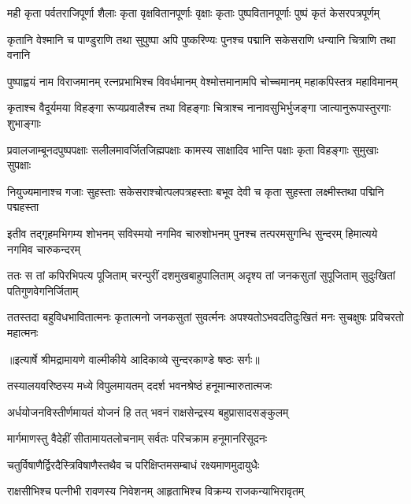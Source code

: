 \fourlineindentedshloka
{मही कृता पर्वतराजिपूर्णा}
{शैलाः कृता वृक्षवितानपूर्णाः}
{वृक्षाः कृताः पुष्पवितानपूर्णाः}
{पुष्पं कृतं केसरपत्रपूर्णम्} %

\fourlineindentedshloka
{कृतानि वेश्मानि च पाण्डुराणि}
{तथा सुपुष्पा अपि पुष्करिण्यः}
{पुनश्च पद्मानि सकेसराणि}
{धन्यानि चित्राणि तथा वनानि} %

\fourlineindentedshloka
{पुष्पाह्वयं नाम विराजमानम्}
{रत्नप्रभाभिश्च विवर्धमानम्}
{वेश्मोत्तमानामपि चोच्चमानम्}
{महाकपिस्तत्र महाविमानम्} %

\fourlineindentedshloka
{कृताश्च वैदूर्यमया विहङ्गा}
{रूप्यप्रवालैश्च तथा विहङ्गाः}
{चित्राश्च नानावसुभिर्भुजङ्गा}
{जात्यानुरूपास्तुरगाः शुभाङ्गाः} %

\fourlineindentedshloka
{प्रवालजाम्बूनदपुष्पपक्षाः}
{सलीलमावर्जितजिह्मपक्षाः}
{कामस्य साक्षादिव भान्ति पक्षाः}
{कृता विहङ्गाः सुमुखाः सुपक्षाः} %

\fourlineindentedshloka
{नियुज्यमानाश्च गजाः सुहस्ताः}
{सकेसराश्चोत्पलपत्रहस्ताः}
{बभूव देवी च कृता सुहस्ता}
{लक्ष्मीस्तथा पद्मिनि पद्महस्ता} %

\fourlineindentedshloka
{इतीव तद्गृहमभिगम्य शोभनम्}
{सविस्मयो नगमिव चारुशोभनम्}
{पुनश्च तत्परमसुगन्धि सुन्दरम्}
{हिमात्यये नगमिव चारुकन्दरम्} %

\fourlineindentedshloka
{ततः स तां कपिरभिपत्य पूजिताम्}
{चरन्पुरीं दशमुखबाहुपालिताम्}
{अदृश्य तां जनकसुतां सुपूजिताम्}
{सुदुःखितां पतिगुणवेगनिर्जिताम्} %

\fourlineindentedshloka
{ततस्तदा बहुविधभावितात्मनः}
{कृतात्मनो जनकसुतां सुवर्त्मनः}
{अपश्यतोऽभवदतिदुःखितं मनः}
{सुचक्षुषः प्रविचरतो महात्मनः} %


{॥इत्यार्षे श्रीमद्रामायणे वाल्मीकीये आदिकाव्ये सुन्दरकाण्डे षष्ठः सर्गः॥}


\twolineshloka
{तस्यालयवरिष्ठस्य मध्ये विपुलमायतम्}
{ददर्श भवनश्रेष्ठं हनूमान्मारुतात्मजः} %

\twolineshloka
{अर्धयोजनविस्तीर्णमायतं योजनं हि तत्}
{भवनं राक्षसेन्द्रस्य बहुप्रासादसङ्कुलम्} %

\twolineshloka
{मार्गमाणस्तु वैदेहीं सीतामायतलोचनाम्}
{सर्वतः परिचक्राम हनूमानरिसूदनः} %

\twolineshloka
{चतुर्विषाणैर्द्विरदैस्त्रिविषाणैस्तथैव च}
{परिक्षिप्तमसम्बाधं रक्ष्यमाणमुदायुधैः} %

\twolineshloka
{राक्षसीभिश्च पत्नीभी रावणस्य निवेशनम्}
{आहृताभिश्च विक्रम्य राजकन्याभिरावृतम्} %

